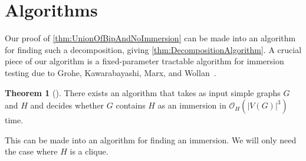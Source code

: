 \documentclass{article}
\theoremstyle{definition}
\newtheorem{theorem}[environment]{Theorem}
\begin{document}
\section{Algorithms}

Our proof of \cref{thm:UnionOfBipAndNoImmersion} can be made into an algorithm for finding such a decomposition, giving \cref{thm:DecompositionAlgorithm}. A crucial piece of our algorithm is a fixed-parameter tractable algorithm for immersion testing due to Grohe, Kawarabayashi, Marx, and Wollan~\cite{Grohe2011Finding}.

\begin{theorem}[{\cite[Corollary~1.2]{Grohe2011Finding}}]\label{thm:ImmersionTesting}
    There exists an algorithm that takes as input simple graphs $G$ and $H$ and decides whether $G$ contains $H$ as an immersion in $\mathcal{O}_{H}(|V(G)|^3)$ time.
\end{theorem}

This can be made into an algorithm for finding an immersion. We will only need the case where $H$ is a clique.
\end{document}
